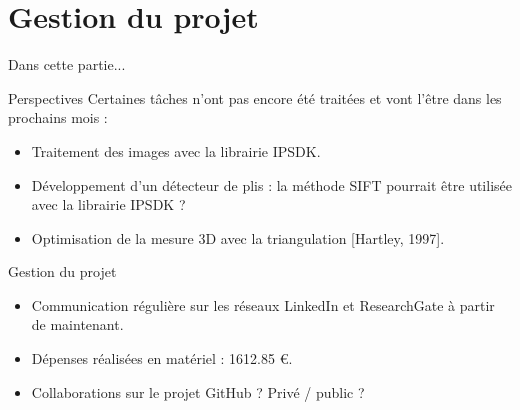 \documentclass[8pt]{beamer}
\begin{document}
\section{Gestion du projet}
\begin{frame}{Dans cette partie...}
	\tableofcontents[sectionstyle=show/shaded, subsectionstyle=show/show/shaded]
\end{frame}
	\begin{frame}{Perspectives}
		Certaines tâches n'ont pas encore été traitées et vont l'être dans les prochains mois :
		\begin{itemize}
			\item Traitement des images avec la librairie IPSDK.
			\item Développement d'un détecteur de plis : la méthode SIFT pourrait être utilisée avec la librairie IPSDK ?
			\item Optimisation de la mesure 3D avec la triangulation [Hartley, 1997].
		\end{itemize}
	\end{frame}
	\begin{frame}{Gestion du projet}
		\begin{itemize}
			\item Communication régulière sur les réseaux LinkedIn et ResearchGate à partir de maintenant.
			\item Dépenses réalisées en matériel : \num{1612.85} \euro.
			\item Collaborations sur le projet GitHub ? Privé / public ?
		\end{itemize}
	\end{frame}
\end{document}
